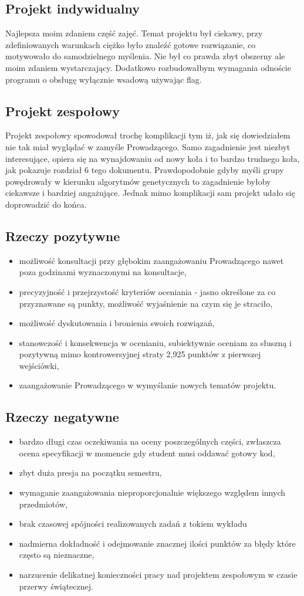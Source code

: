 \documentclass[a4paper,11pt]{article}
\begin{document}
\subsection{Projekt indywidualny}
Najlepsza moim zdaniem część zajęć. Temat projektu był ciekawy, przy zdefiniowanych warunkach ciężko było znaleźć gotowe rozwiązanie, co motywowało do samodzielnego myślenia. Nie był co prawda zbyt obszerny ale moim zdaniem wystarczający. Dodatkowo rozbudowałbym wymagania odnoście programu o obsługę wyłącznie wsadową używając flag.
\subsection{Projekt zespołowy}
Projekt zespołowy spowodował trochę komplikacji tym iż, jak się dowiedziałem nie tak miał wyglądać w zamyśle Prowadzącego. Samo zagadnienie jest niezbyt interesujące, opiera się na wynajdowaniu od nowy koła i to bardzo trudnego koła, jak pokazuje rozdział 6 tego dokumentu. Prawdopodobnie gdyby myśli grupy powędrowały w kierunku algorytmów genetycznych to zagadnienie byłoby ciekawsze i bardziej angażujące. Jednak mimo komplikacji sam projekt udało się doprowadzić do końca.
\subsection{Rzeczy pozytywne}
\begin{itemize}
\item możliwość konsultacji przy głębokim zaangażowaniu Prowadzącego nawet poza godzinami wyznaczonymi na konsultacje,
\item precyzyjność i przejrzystość kryteriów oceniania - jasno określone za co przyznawane są punkty, możliwość wyjaśnienie na czym się je straciło,
\item możliwość dyskutowania i bronienia swoich rozwiązań,
\item stanowczość i konsekwencja w ocenianiu, subiektywnie oceniam za słuszną i pozytywną mimo kontrowersyjnej straty 2,925 punktów z pierwszej wejściówki,
\item zaangażowanie Prowadzącego w wymyślanie nowych tematów projektu.
\end{itemize}
\subsection{Rzeczy negatywne}
\begin{itemize}
\item bardzo długi czas oczekiwania na oceny poszczególnych części, zwłaszcza ocena specyfikacji w momencie gdy student musi oddawać gotowy kod,
\item zbyt duża presja na początku semestru,
\item wymaganie zaangażowania nieproporcjonalnie większego względem innych przedmiotów,
\item brak czasowej spójności realizowanych zadań z tokiem wykładu
\item nadmierna dokładność i odejmowanie znacznej ilości punktów za błędy które często są nieznaczne,
\item narzucenie delikatnej konieczności pracy nad projektem zespołowym w czasie przerwy świątecznej.
\end{itemize}
\end{document}
